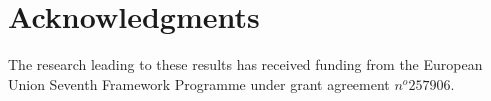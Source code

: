 \documentclass{sig-alternate}
\begin{document}


\section{Acknowledgments}
The research leading to these results has received funding from the European Union Seventh Framework Programme under grant agreement $n^o 257906$.
%

%
%
\end{document}
